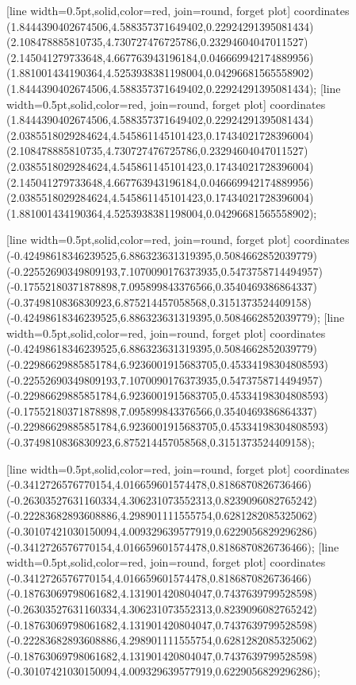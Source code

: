 [line width=0.5pt,solid,color=red, join=round, forget plot] coordinates {(1.8444390402674506,4.588357371649402,0.22924291395081434) (2.108478885810735,4.730727476725786,0.23294604047011527) (2.145041279733648,4.667763943196184,0.046669942174889956) (1.881001434190364,4.5253938381198004,0.04296681565558902) (1.8444390402674506,4.588357371649402,0.22924291395081434)};
[line width=0.5pt,solid,color=red, join=round, forget plot] coordinates {(1.8444390402674506,4.588357371649402,0.22924291395081434) (2.0385518029284624,4.545861145101423,0.17434021728396004) (2.108478885810735,4.730727476725786,0.23294604047011527) (2.0385518029284624,4.545861145101423,0.17434021728396004) (2.145041279733648,4.667763943196184,0.046669942174889956) (2.0385518029284624,4.545861145101423,0.17434021728396004) (1.881001434190364,4.5253938381198004,0.04296681565558902)};

[line width=0.5pt,solid,color=red, join=round, forget plot] coordinates {(-0.42498618346239525,6.886323631319395,0.5084662852039779) (-0.22552690349809193,7.1070090176373935,0.5473758714494957) (-0.17552180371878898,7.095899843376566,0.3540469386864337) (-0.3749810836830923,6.875214457058568,0.3151373524409158) (-0.42498618346239525,6.886323631319395,0.5084662852039779)};
[line width=0.5pt,solid,color=red, join=round, forget plot] coordinates {(-0.42498618346239525,6.886323631319395,0.5084662852039779) (-0.22986629885851784,6.9236001915683705,0.45334198304808593) (-0.22552690349809193,7.1070090176373935,0.5473758714494957) (-0.22986629885851784,6.9236001915683705,0.45334198304808593) (-0.17552180371878898,7.095899843376566,0.3540469386864337) (-0.22986629885851784,6.9236001915683705,0.45334198304808593) (-0.3749810836830923,6.875214457058568,0.3151373524409158)};

[line width=0.5pt,solid,color=red, join=round, forget plot] coordinates {(-0.3412726576770154,4.016659601574478,0.8186870826736466) (-0.26303527631160334,4.306231073552313,0.8239096082765242) (-0.22283682893608886,4.298901111555754,0.6281282085325062) (-0.30107421030150094,4.009329639577919,0.6229056829296286) (-0.3412726576770154,4.016659601574478,0.8186870826736466)};
[line width=0.5pt,solid,color=red, join=round, forget plot] coordinates {(-0.3412726576770154,4.016659601574478,0.8186870826736466) (-0.18763069798061682,4.131901420804047,0.7437639799528598) (-0.26303527631160334,4.306231073552313,0.8239096082765242) (-0.18763069798061682,4.131901420804047,0.7437639799528598) (-0.22283682893608886,4.298901111555754,0.6281282085325062) (-0.18763069798061682,4.131901420804047,0.7437639799528598) (-0.30107421030150094,4.009329639577919,0.6229056829296286)};

